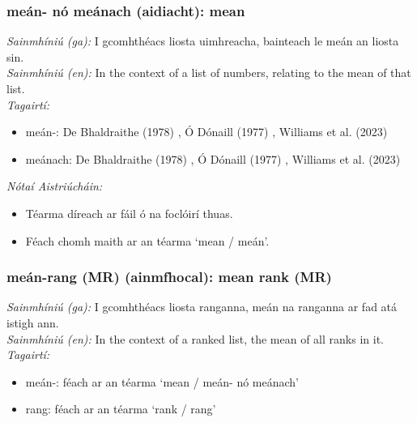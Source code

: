\documentclass{article}
\begin{document}
\subsubsection*{meán- nó meánach (aidiacht): mean}
 \noindent \textit{Sainmhíniú (ga):} I gcomhthéacs liosta uimhreacha, bainteach le meán an liosta sin.
\\
 \noindent \textit{Sainmhíniú (en):} In the context of a list of numbers, relating to the mean of that list.
\\
 \noindent \textit{Tagairtí:}
\begin{itemize}
	\item meán-: De Bhaldraithe (1978) \cite{de-bhaldraithe}, Ó Dónaill (1977) \cite{odonaill}, Williams et al. (2023) \cite{storchiste}
	\item meánach: De Bhaldraithe (1978) \cite{de-bhaldraithe}, Ó Dónaill (1977) \cite{odonaill}, Williams et al. (2023) \cite{storchiste}
\end{itemize}

 \noindent \textit{Nótaí Aistriúcháin:}
\begin{itemize}
	\item Téarma díreach ar fáil ó na foclóirí thuas.
	\item Féach chomh maith ar an téarma `mean / meán'.
\end{itemize}


\subsubsection*{meán-rang (MR) (ainmfhocal): mean rank (MR)}
 \noindent \textit{Sainmhíniú (ga):} I gcomhthéacs liosta ranganna, meán na ranganna ar fad atá istigh ann.
\\
 \noindent \textit{Sainmhíniú (en):} In the context of a ranked list, the mean of all ranks in it.
\\
 \noindent \textit{Tagairtí:}
\begin{itemize}
	\item meán-: féach ar an téarma `mean / meán- nó meánach'
	\item rang: féach ar an téarma `rank / rang'
\end{itemize}
\end{document}
